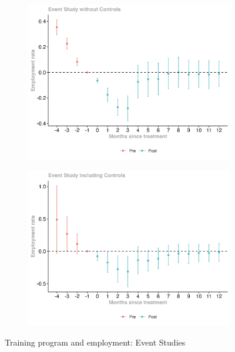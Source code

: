 \documentclass{scrartcl}
\begin{document}
\begin{figure}[h!]
  \centering
  
  \begin{subfigure}[t]{0.48\textwidth}
    \centering
    \includegraphics[width=\linewidth]{output/figures/final_event_study_employment_rate.jpg}
    \label{fig:event_study}
  \end{subfigure}
  \hfill
  \begin{subfigure}[t]{0.48\textwidth}
    \centering
    \includegraphics[width=\linewidth]{output/figures/final_event_study_employment_rate_controls.jpg}
    \label{fig:event_study_controls}
  \end{subfigure}

  \caption{Training program and employment: Event Studies}
  \label{fig:event_studies}
\end{figure}
\end{document}
